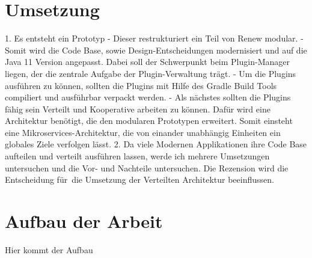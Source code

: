 \section{Umsetzung}
1. Es entsteht ein Prototyp 
	- Dieser restrukturiert ein Teil von Renew modular.
	- Somit wird die Code Base, sowie Design-Entscheidungen modernisiert und auf die Java 11 Version angepasst. Dabei soll der Schwerpunkt beim Plugin-Manager liegen, der die zentrale Aufgabe der Plugin-Verwaltung trägt.    
	- Um die Plugins ausführen zu können, sollten die Plugins mit Hilfe des Gradle Build Tools compiliert und ausführbar verpackt werden. 
	-  Als nächstes sollten die Plugins fähig sein Verteilt und Kooperative arbeiten zu können. Dafür wird eine Architektur benötigt, die den modularen Prototypen erweitert. Somit einsteht eine Mikroservices-Architektur, die von einander unabhängig Einheiten ein globales Ziele verfolgen lässt. 
2. Da viele Modernen Applikationen ihre Code Base aufteilen und verteilt ausführen lassen, werde ich mehrere Umsetzungen untersuchen und die Vor- und Nachteile untersuchen. Die Rezension wird die Entscheidung für die Umsetzung der Verteilten Architektur beeinflussen.

\section{Aufbau der Arbeit}
Hier kommt der Aufbau 

